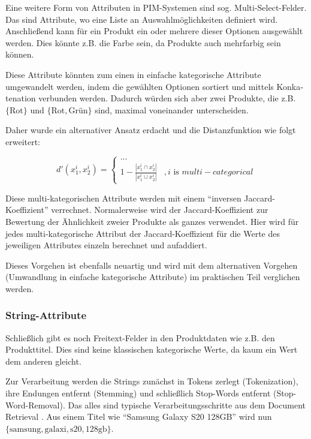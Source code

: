Eine weitere Form von Attributen in PIM-Systemen sind sog.
Multi-Select-Felder. Das sind Attribute, wo eine Liste an
Auswahlmöglichkeiten definiert wird. Anschließend kann für ein Produkt
ein oder mehrere dieser Optionen ausgewählt werden. Dies könnte z.B. die
Farbe sein, da Produkte auch mehrfarbig sein können.

Diese Attribute könnten zum einen in einfache kategorische Attribute
umgewandelt werden, indem die gewählten Optionen sortiert und mittels
Kon­ka­te­na­ti­on verbunden werden. Dadurch würden sich aber zwei Produkte,
die z.B. \(\{\text{Rot}\}\) und \(\{\text{Rot},\text{Grün}\}\) sind,
maximal voneinander unterscheiden.

Daher wurde ein alternativer Ansatz erdacht und die Distanzfunktion wie
folgt erweitert:

\begin{equation}
d'(x_1^i, x_2^i) = \begin{cases}
    ... \\
    1 - \frac{|x_1^i \cap x_2^i|}{|x_1^i \cup x_2^i|} &, i \text{ is } multi-categorical
\end{cases}
\end{equation}

Diese multi-kategorischen Attribute werden mit einem ``inversen
Jaccard-Koeffizient'' verrechnet. Normalerweise wird der
Jaccard-Koeffizient zur Bewertung der Ähnlichkeit zweier Produkte als
ganzes verwendet. Hier wird für jedes multi-kategorische Attribut der
Jaccard-Koeffizient für die Werte des jeweiligen Attributes einzeln
berechnet und aufaddiert.

Dieses Vorgehen ist ebenfalls neuartig und wird mit dem alternativen
Vorgehen (Umwandlung in einfache kategorische Attribute) im praktischen
Teil verglichen werden.

\hypertarget{string-attribute}{%
\subsubsection{String-Attribute}\label{string-attribute}}

Schließlich gibt es noch Freitext-Felder in den Produktdaten wie z.B.
den Produkttitel. Dies sind keine klassischen kategorische Werte, da
kaum ein Wert dem anderen gleicht. \autocite{rajalingam2011}

Zur Verarbeitung werden die Strings zunächst in Tokens zerlegt
(Tokenization), ihre Endungen entfernt (Stemming) und schließlich
Stop-Words entfernt (Stop-Word-Removal). Das alles sind typische
Verarbeitungsschritte aus dem Document Retrieval \autocite{cohen2003}.
Aus einem Titel wie ``Samsung Galaxy S20 128GB'' wird nun
\(\{\text{samsung}, \text{galaxi}, \text{s20}, \text{128gb}\}\).

